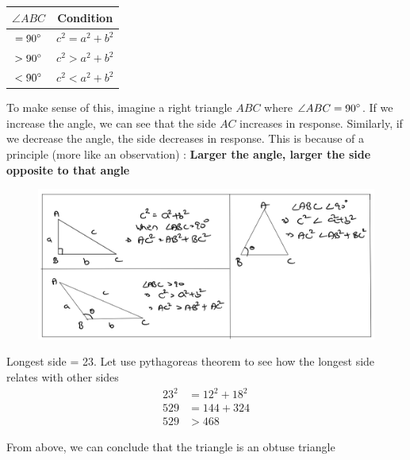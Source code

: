 \begin{table}[h!]
    \centering
    \begin{tabular}{|| c | c ||}
        \hline
         $\angle{ABC}$ & Condition  \\
        \hline
         $= {90}^{\circ}$ & $c^2 = a^2 + b^2$ \\ 
        \hline
         $> {90}^{\circ}$ & $c^2 > a^2 + b^2$ \\ 
        \hline
         $< {90}^{\circ}$ & $c^2 < a^2 + b^2$ \\ 
        \hline
    \end{tabular}
\end{table}

To make sense of this, imagine a right triangle $ABC$ where $\angle{ABC} = {90}^{\circ}$. If we increase the angle, we can see that the side $AC$ increases in response. Similarly, if we decrease the angle, the side decreases in response. This is because of a principle (more like an observation) : \textbf{Larger the angle, larger the side opposite to that angle}

\begin{figure}[h!]
    \centering
    \includegraphics[width=1.0\linewidth]{Quant//Geometry//Images//Triangles/triangle_8_right_obtuse_acute_logic.png}
\end{figure}


Longest side = 23. Let use pythagoreas theorem to see how the longest side relates with other sides
\begin{align*}
    23^2 &= 12^2 + 18^2 \\
    529 &= 144 + 324 \\
    529 &> 468
\end{align*}

From above, we can conclude that the triangle is an obtuse triangle

